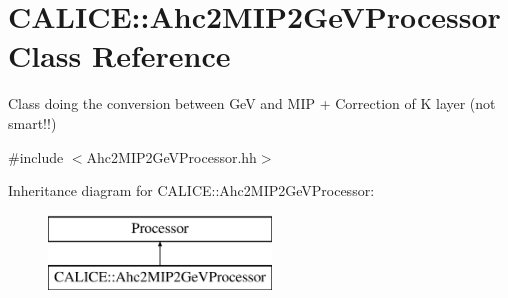 \section{C\-A\-L\-I\-C\-E\-:\-:Ahc2\-M\-I\-P2\-Ge\-V\-Processor Class Reference}
\label{classCALICE_1_1Ahc2MIP2GeVProcessor}


Class doing the conversion between Ge\-V and M\-I\-P + Correction of K layer (not smart!!)  




{\ttfamily \#include $<$Ahc2\-M\-I\-P2\-Ge\-V\-Processor.\-hh$>$}

Inheritance diagram for C\-A\-L\-I\-C\-E\-:\-:Ahc2\-M\-I\-P2\-Ge\-V\-Processor\-:\begin{figure}[H]
\begin{center}
\leavevmode
\includegraphics[height=2.000000cm]{classCALICE_1_1Ahc2MIP2GeVProcessor}
\end{center}
\end{figure}
